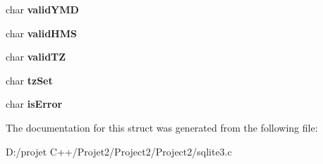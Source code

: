 \begin{DoxyCompactItemize}
char {\bfseries valid\+Y\+MD}
\item 
\mbox{\label{struct_date_time_aba26b32c6142cf6bfc09db3088b90add}} 
char {\bfseries valid\+H\+MS}
\item 
\mbox{\label{struct_date_time_af3dfda2bdbb2183dc1b94f449701b81e}} 
char {\bfseries valid\+TZ}
\item 
\mbox{\label{struct_date_time_a1d3f01eb19ad909d0e2a13c25cf4e48e}} 
char {\bfseries tz\+Set}
\item 
\mbox{\label{struct_date_time_ae832be3745b698b81b736029e188853b}} 
char {\bfseries is\+Error}
\end{DoxyCompactItemize}


The documentation for this struct was generated from the following file\+:\begin{DoxyCompactItemize}
\item 
D\+:/projet C++/\+Projet2/\+Project2/\+Project2/sqlite3.\+c\end{DoxyCompactItemize}
